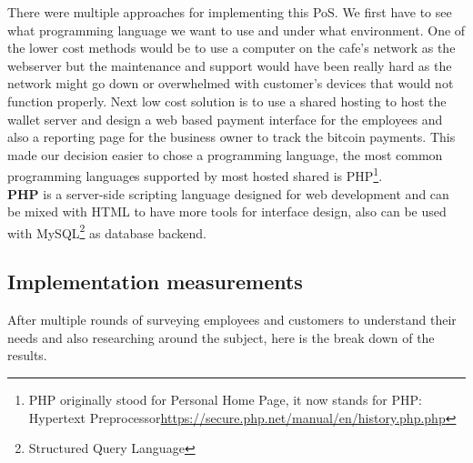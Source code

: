 There were multiple approaches for implementing this PoS. We first have to see what programming language we want to use and under what environment. One of the lower cost methods would be to use a computer on the cafe's network as the webserver but the maintenance and support would have been really hard as the network might go down or overwhelmed with customer's devices that would not function properly. Next low cost solution is to use a shared hosting to host the wallet server and design a web based payment interface for the employees and also a reporting page for the business owner to track the bitcoin payments. This made our decision easier to chose a programming language, the most common programming languages supported by most hosted shared is PHP\footnote{PHP originally stood for Personal Home Page, it now stands for PHP: Hypertext Preprocessor\url{https://secure.php.net/manual/en/history.php.php}}. 
\\ \textbf{PHP} is a server-side scripting language designed for web development and can be mixed with HTML to have more tools for interface design, also can be used with MySQL\footnote{Structured Query Language} as database backend.

\subsection{Implementation measurements}
After multiple rounds of surveying employees and customers to understand their needs and also researching around the subject, here is the break down of the results.
